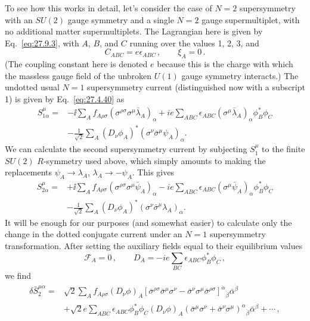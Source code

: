To see how this works in detail, let's consider the case of \(N=2\)
supersymmetry with an \(SU(2)\) gauge symmetry and a single \(N=2\) gauge
supermultiplet, with no additional matter supermultiplets. The Lagrangian here
is given by Eq.~\eqref{eq:27.9.3}, with \(A\), \(B\), and \(C\) running over
the values 1, 2, 3, and
\begin{equation}
  C_{ABC}=e\epsilon_{ABC}\,,
  \qquad
  \xi_A=0\,.
  \tag{27.9.13}\label{eq:27.9.13}
\end{equation}
(The coupling constant here is denoted \(e\) because this is the charge with
which the massless gauge field of the unbroken \(U(1)\) gauge symmetry
interacts.) The undotted usual \(N=1\) supersymmetry current (distinguished
now with a subscript 1) is given by Eq.~\eqref{eq:27.4.40} as
\begin{equation}
  \begin{aligned}
  S_{1\alpha}^\mu={}&
  -\ii\sum_A f_{A\rho\sigma}
    (\sigma^{\rho\sigma}\sigma^\mu\bar\lambda_A)_\alpha
  +ie\sum_{ABC}\epsilon_{ABC}
    (\sigma^\mu\bar\lambda_A)_\alpha\phi_B^*\phi_C
  \\
  &-\frac{1}{\sqrt{2}}\sum_A(D_\nu\phi_A)^*
    (\sigma^\nu\bar\sigma^\mu\psi_A)_\alpha .
  \end{aligned}
  \tag{27.9.14}\label{eq:27.9.14}
\end{equation}
We can calculate the second supersymmetry current by subjecting \(S_1^\mu\)
to the finite \(SU(2)\) \(R\)-symmetry used above, which simply amounts to
making the replacements
\(\psi_A\longrightarrow\lambda_A\),
\(\lambda_A\longrightarrow-\psi_A\). This gives
\begin{equation}
  \begin{aligned}
  S_{2\alpha}^\mu={}&
  +\ii\sum_A f_{A\rho\sigma}
    (\sigma^{\rho\sigma}\sigma^\mu\bar\psi_A)_\alpha
  -ie\sum_{ABC}\epsilon_{ABC}
    (\sigma^\mu\bar\psi_A)_\alpha\phi_B^*\phi_C
  \\
  &-\frac{1}{\sqrt{2}}\sum_A(D_\nu\phi_A)^*
    (\sigma^\nu\bar\sigma^\mu\lambda_A)_\alpha .
  \end{aligned}
  \tag{27.9.15}\label{eq:27.9.15}
\end{equation}
It will be enough for our purposes (and somewhat easier) to calculate only
the change in the dotted conjugate current under an \(N=1\)
supersymmetry transformation. After setting the auxiliary fields equal to
their equilibrium values
\[
  \mathcal{F}_A=0\,,
  \qquad
  D_A=-ie\sum_{BC}\epsilon_{ABC}\phi_B^*\phi_C\,,
\]
we find
\[
  \begin{aligned}
  \delta\bar S_2^{\mu\dot\alpha}={}&
  \sqrt{2}\sum_A f_{A\rho\sigma}(D_\nu\phi)_A
  \left[
    \bar\sigma^{\rho\sigma}\bar\sigma^\mu\sigma^\nu
    -\bar\sigma^\nu\sigma^\mu\bar\sigma^{\rho\sigma}
  \right]^{\dot\alpha}{}_{\dot\beta}\bar\alpha^{\dot\beta}
  \\
  &+\sqrt{2}e\sum_{ABC}\epsilon_{ABC}\phi_B^*\phi_C
    (D_\nu\phi)_A
    \left(\bar\sigma^\mu\sigma^\nu
      +\bar\sigma^\nu\sigma^\mu\right)^{\dot\alpha}{}_{\dot\beta}
      \bar\alpha^{\dot\beta}
  +\cdots\,,
  \end{aligned}
\]
